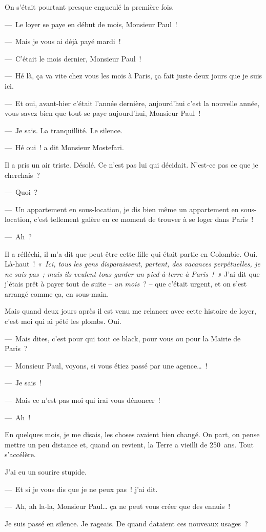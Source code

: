 \documentclass[french,twoside]{book} %
\begin{document}
On s’était pourtant presque engueulé la première fois.\par
— Le loyer se paye en début de mois, Monsieur Paul !\par
— Mais je vous ai déjà payé mardi !\par
— C’était le mois dernier, Monsieur Paul !\par
— Hé là, ça va vite chez vous les mois à Paris, ça fait juste deux jours que je suis ici.\par
— Et oui, avant-hier c’était l’année dernière, aujourd’hui c’est la nouvelle année, vous savez bien que tout se paye aujourd’hui, Monsieur Paul !\par
— Je sais. La tranquillité. Le silence.\par
— Hé oui ! a dit Monsieur Mostefari.\par
Il a pris un air triste. Désolé. Ce n’est pas lui qui décidait. N’est-ce pas ce que je cherchais ?\par
— Quoi ?\par
— Un appartement en sous-location, je dis bien même un appartement en sous-location, c’est tellement galère en ce moment de trouver à se loger dans Paris !\par
— Ah ?\par
Il a réfléchi, il m’a dit que peut-être cette fille qui était partie en Colombie. Oui. Là-haut ! \emph{« Ici, tous les gens disparaissent, partent, des vacances perpétuelles, je ne sais pas ; mais ils veulent tous garder un pied-à-terre à Paris ! »} J’ai dit que j’étais prêt à payer tout de suite – \emph{un mois} ? – que c’était urgent, et on s’est arrangé comme ça, en sous-main.\par
Mais quand deux jours après il est venu me relancer avec cette histoire de loyer, c’est moi qui ai pété les plombs. Oui.\par
— Mais dites, c’est pour qui tout ce black, pour vous ou pour la Mairie de Paris ?\par
— Monsieur Paul, voyons, si vous étiez passé par une agence… !\par
— Je sais !\par
— Mais ce n’est pas moi qui irai vous dénoncer !\par
— Ah !\par
En quelques mois, je me disais, les choses avaient bien changé. On part, on pense mettre un peu distance et, quand on revient, la Terre a vieilli de 250 ans. Tout s’accélère.\par
J’ai eu un sourire stupide.\par
— Et si je vous dis que je ne peux pas ! j’ai dit.\par
— Ah, ah la-la, Monsieur Paul… ça ne peut vous créer que des ennuis !\par
Je suis passé en silence. Je rageais. De quand dataient ces nouveaux usages ?
\end{document}
